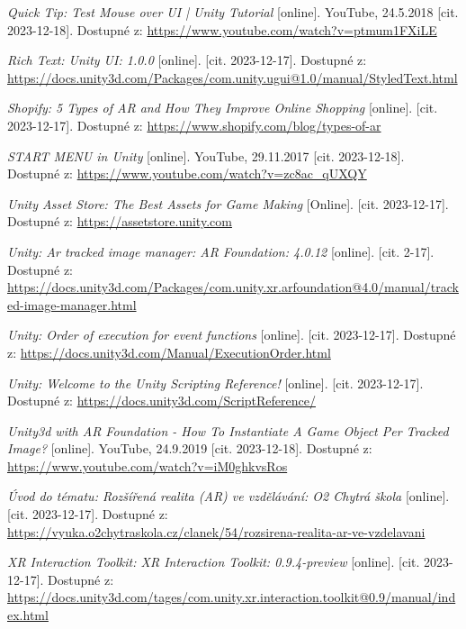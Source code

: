 \documentclass[12pt, a4paper,
twoside,        %
openright
]{report}
\begin{document}
\begin{thebibliography}{99}
 \textit{Quick Tip: Test Mouse over UI | Unity Tutorial} [online]. YouTube, 24.5.2018 [cit. 2023-12-18]. Dostupné z: \url{https://www.youtube.com/watch?v=ptmum1FXiLE}

\textit{Rich Text: Unity UI: 1.0.0} [online]. [cit. 2023-12-17]. Dostupné z: \url{https://docs.unity3d.com/Packages/com.unity.ugui@1.0/manual/StyledText.html}

\textit{Shopify: 5 Types of AR and How They Improve Online Shopping} [online]. [cit. 2023-12-17]. Dostupné z: \url{https://www.shopify.com/blog/types-of-ar}	

 \textit{START MENU in Unity} [online]. YouTube, 29.11.2017 [cit. 2023-12-18]. Dostupné z: \url{https://www.youtube.com/watch?v=zc8ac_qUXQY}

\textit{Unity Asset Store: The Best Assets for Game Making} [Online]. [cit. 2023-12-17]. Dostupné z: \url{https://assetstore.unity.com}

\textit{Unity: Ar tracked image manager: AR Foundation: 4.0.12} [online]. [cit. 2-17]. Dostupné z: \url{https://docs.unity3d.com/Packages/com.unity.xr.arfoundation@4.0/manual/tracked-image-manager.html}

\textit{Unity: Order of execution for event functions} [online]. [cit. 2023-12-17]. Dostupné z: \url{https://docs.unity3d.com/Manual/ExecutionOrder.html}

\textit{Unity: Welcome to the Unity Scripting Reference!} [online]. [cit. 2023-12-17]. Dostupné z: \url{https://docs.unity3d.com/ScriptReference/}

 \textit{Unity3d with AR Foundation - How To Instantiate A Game Object Per Tracked Image?} [online]. YouTube, 24.9.2019 [cit. 2023-12-18]. Dostupné z: \url{https://www.youtube.com/watch?v=iM0ghkvsRos}

\textit{Úvod do tématu: Rozšířená realita (AR) ve vzdělávání: O2 Chytrá škola} [online]. [cit. 2023-12-17]. Dostupné z: \url{https://vyuka.o2chytraskola.cz/clanek/54/rozsirena-realita-ar-ve-vzdelavani}

\textit{XR Interaction Toolkit: XR Interaction Toolkit: 0.9.4-preview} [online]. [cit. 2023-12-17]. Dostupné z: \url{https://docs.unity3d.com/tages/com.unity.xr.interaction.toolkit@0.9/manual/index.html}



\end{thebibliography}

\listoffigures
\end{document}
